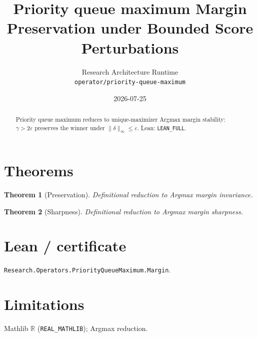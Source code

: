 \documentclass[11pt]{article}
\title{Priority queue maximum Margin Preservation under Bounded Score Perturbations}
\author{Research Architecture Runtime \\ \texttt{operator/priority-queue-maximum}}
\date{2026-07-25}
\newtheorem{theorem}{Theorem}
\begin{document}
\maketitle
\begin{abstract}
Priority queue maximum reduces to unique-maximizer Argmax margin stability: $\gamma>2\varepsilon$
preserves the winner under $\|\delta\|_\infty\le\varepsilon$. Lean: \texttt{LEAN\_FULL}.
\end{abstract}
\section{Theorems}
\begin{theorem}[Preservation]
Definitional reduction to Argmax margin invariance.
\end{theorem}
\begin{theorem}[Sharpness]
Definitional reduction to Argmax margin sharpness.
\end{theorem}
\section{Lean / certificate}
\texttt{Research.Operators.PriorityQueueMaximum.Margin}.
\section{Limitations}
Mathlib $\mathbb{R}$ (\texttt{REAL\_MATHLIB}); Argmax reduction.
\end{document}
